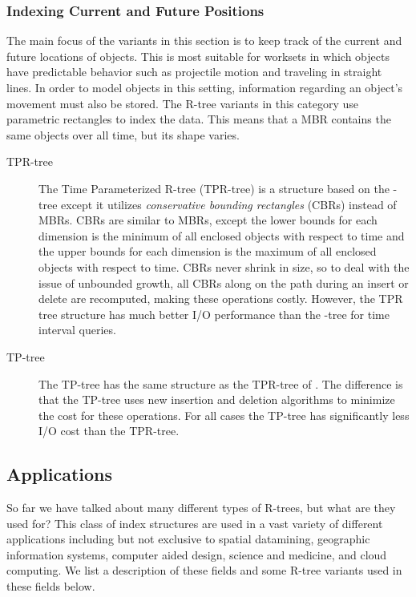 \subsubsection{Indexing Current and Future Positions}
The main focus of the variants in this section is to keep track of the current
and future locations of objects. This is most suitable for worksets in which 
objects have predictable behavior such as projectile motion and traveling in
straight lines. In order to model objects in this setting, information regarding
an object's movement must also be stored. The R-tree variants in this category 
use parametric rectangles to index the data. This means that a MBR contains
the same objects over all time, but its shape varies. 

\begin{description}
	\item[TPR-tree] The Time Parameterized R-tree (TPR-tree) 
	\cite{vsaltenis2000indexing} is a structure based on the \rstar-tree 
	except it utilizes \emph{conservative bounding rectangles} (CBRs) 
	instead of MBRs. CBRs are similar to MBRs, except the lower bounds for 
	each dimension is the minimum of all enclosed objects with respect to 
	time and the upper bounds for each dimension is the maximum of all 
	enclosed objects with respect to time. CBRs never shrink in size, so to 
	deal with the issue of unbounded growth, all CBRs along on the path 
	during an insert or delete are recomputed, making these operations costly. 
	However, the TPR tree structure has much better I/O performance than the 
	\rstar-tree for time interval queries. 
	\item[TP\rstar-tree] The TP\rstar-tree \cite{tao2003tpr} has the same 
	structure as the TPR-tree of \cite{vsaltenis2000indexing}. The difference
	is that the TP\rstar-tree uses new insertion and deletion algorithms to 
	minimize the cost for these operations. For all cases the TP\rstar-tree
	has significantly less I/O cost than the TPR-tree. 
\end{description}


\subsection{Applications}
So far we have talked about many different types of R-trees, but what are they
used for? This class of index structures are used in a vast variety of different
applications including but not exclusive to spatial datamining, geographic 
information systems, computer aided design, science and medicine, and cloud 
computing. We list a description of these fields and some R-tree variants used 
in these fields below.

